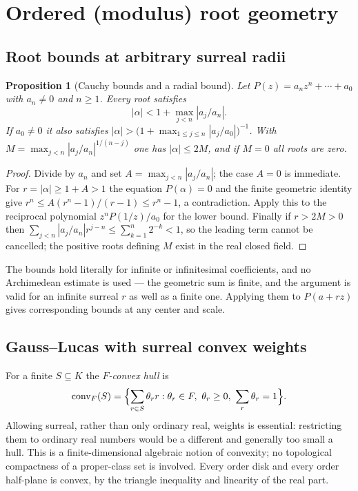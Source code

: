 \documentclass[11pt,letterpaper]{article}
\numberwithin{equation}{section}
\newtheorem{proposition}[theorem]{Proposition}
\theoremstyle{definition}
\theoremstyle{remark}\newtheorem{remark}[theorem]{Remark}
\newcommand{\conv}{\operatorname{conv}}
\begin{document}
\section{Ordered (modulus) root geometry}\label{polynomial:sec:ordergeometry}

\subsection{Root bounds at arbitrary surreal radii}
\begin{proposition}[Cauchy bounds and a radial bound]\label{polynomial:prop:rootbounds}
Let $P(z)=a_nz^n+\cdots+a_0$ with $a_n\ne0$ and $n\ge1$. Every root satisfies
\begin{equation}\label{polynomial:eq:cauchybound}
 |\alpha|<1+\max_{j<n}|a_j/a_n| .
\end{equation}
If $a_0\ne0$ it also satisfies $|\alpha|>\bigl(1+\max_{1\le j\le
n}|a_j/a_0|\bigr)^{-1}$. With $M=\max_{j<n}|a_j/a_n|^{1/(n-j)}$ one has
$|\alpha|\le2M$, and if $M=0$ all roots are zero.
\end{proposition}
\begin{proof}
Divide by $a_n$ and set $A=\max_{j<n}|a_j/a_n|$; the case $A=0$ is immediate.
For $r=|\alpha|\ge1+A>1$ the equation $P(\alpha)=0$ and the finite geometric
identity give $r^n\le A(r^n-1)/(r-1)\le r^n-1$, a contradiction. Apply this to
the reciprocal polynomial $z^nP(1/z)/a_0$ for the lower bound. Finally if
$r>2M>0$ then $\sum_{j<n}|a_j/a_n|r^{j-n}\le\sum_{k=1}^n2^{-k}<1$, so the
leading term cannot be cancelled; the positive roots defining $M$ exist in the
real closed field.
\end{proof}

The bounds hold literally for infinite or infinitesimal coefficients, and no
Archimedean estimate is used --- the geometric sum is finite, and the argument
is valid for an infinite surreal $r$ as well as a finite one. Applying them to
$P(a+rz)$ gives corresponding bounds at any center and scale.

\subsection{Gauss--Lucas with surreal convex weights}
For a finite $S\subseteq K$ the \emph{$F$-convex hull} is
\[
 \conv_F(S)=\Bigl\{\sum_{r\in S}\theta_r r:\theta_r\in F,\ \theta_r\ge0,\
 \sum_r\theta_r=1\Bigr\}.
\]
Allowing surreal, rather than only ordinary real, weights is essential:
restricting them to ordinary real numbers would be a different and generally
too small a hull. This is a finite-dimensional algebraic notion of convexity;
no topological compactness of a proper-class set is involved. Every order disk
and every order half-plane is convex, by the triangle inequality and linearity
of the real part.
\end{document}
